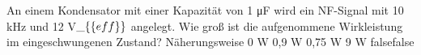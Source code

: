     {An einem Kondensator mit einer Kapazität von 1 μF wird ein NF-Signal mit 10 kHz und 12 V$\_\{\textrm\{eff\}\}$ angelegt. Wie groß ist die aufgenommene Wirkleistung im eingeschwungenen Zustand?}
    {Näherungsweise 0 W}
    {0,9 W}
    {0,75 W}
    {9 W}
    {false}{false}